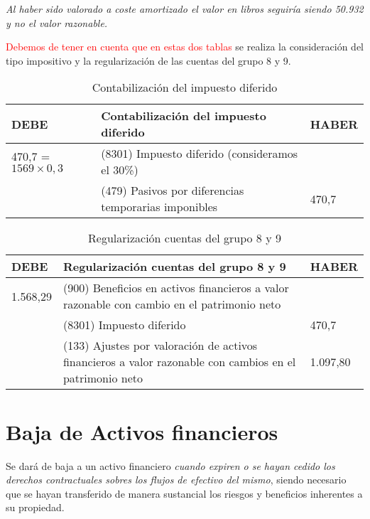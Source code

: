 \textit{Al haber sido valorado a coste amortizado el valor en libros seguiría siendo 50.932 y no el valor razonable.}

\textcolor{red}{Debemos de tener en cuenta que en estas dos tablas} se realiza la consideración del tipo impositivo y la regularización de las cuentas del grupo 8 y 9.

\begin{table}[H]
    \centering
    \begin{tabular}{|p{3cm}|p{6cm}|p{3cm}|}
    \hline
    \rowcolor{blue!30}
    \textbf{DEBE} & \textbf{Contabilización del impuesto diferido} & \textbf{HABER} \\
    \hline
    470,7 = \(1569 \times 0,3\) & (8301) Impuesto diferido (consideramos el 30\%) & \\
    \hline
    & (479) Pasivos por diferencias temporarias imponibles & 470,7 \\
    \hline
    \end{tabular}
    \caption{Contabilización del impuesto diferido}
    \label{tabla:impuesto_diferido}
\end{table}

\begin{table}[H]
    \centering
    \begin{tabular}{|p{3cm}|p{6cm}|p{3cm}|}
    \hline
    \rowcolor{blue!30}
    \textbf{DEBE} & \textbf{Regularización cuentas del grupo 8 y 9} & \textbf{HABER} \\
    \hline
    1.568,29 & (900) Beneficios en activos financieros a valor razonable con cambio en el patrimonio neto & \\
    \hline
    & (8301) Impuesto diferido &470,7  \\
    \hline
    & (133) Ajustes por valoración de activos financieros a valor razonable con cambios en el patrimonio neto & 1.097,80 \\
    \hline
    \end{tabular}
    \caption{Regularización cuentas del grupo 8 y 9}
    \label{tabla:regularizacion_grupo_8_9}
\end{table}

\newpage
\section{Baja de Activos financieros}

Se dará de baja a un activo financiero \textit{cuando expiren o se hayan cedido los derechos contractuales sobres los flujos de efectivo del mismo}, siendo necesario que se hayan transferido de manera sustancial los riesgos y beneficios inherentes a su propiedad. 

